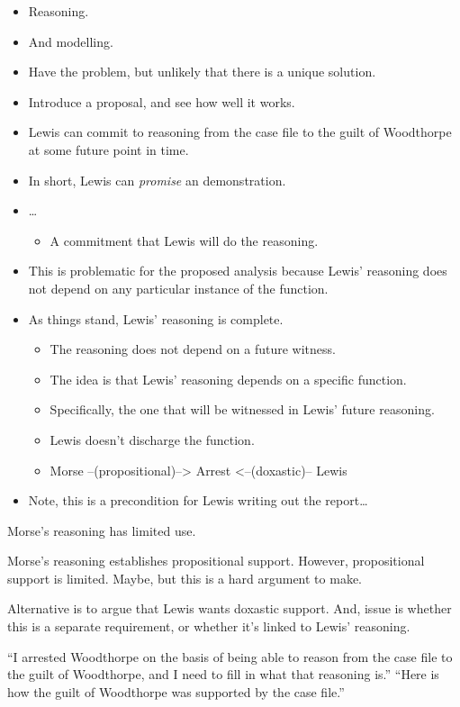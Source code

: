 \documentclass[10pt]{article}
\begin{document}
\begin{itemize}
\item Reasoning.
\item And modelling.
\item Have the problem, but unlikely that there is a unique solution.
\item Introduce a proposal, and see how well it works.
\end{itemize}

\begin{itemize}
\item Lewis can commit to reasoning from the case file to the guilt of Woodthorpe at some future point in time.
\item In short, Lewis can \emph{promise} an demonstration.
\item {\color{red} \dots}
  \begin{itemize}
  \item A commitment that Lewis will do the reasoning.
  \end{itemize}
\item This is problematic for the proposed analysis because Lewis' reasoning does not depend on any particular instance of the function.
\item As things stand, Lewis' reasoning is complete.
  \begin{itemize}
  \item The reasoning does not depend on a future witness.
  \item The idea is that Lewis' reasoning depends on a specific function.
  \item Specifically, the one that will be witnessed in Lewis' future reasoning.
  \item Lewis doesn't discharge the function.
  \item Morse --(propositional)--> Arrest <--(doxastic)-- Lewis
  \end{itemize}
\item {\color{red} Note, this is a precondition for Lewis writing out the report\dots}
\end{itemize}

\begin{note}
  Morse's reasoning has limited use.

  Morse's reasoning establishes propositional support.
  However, propositional support is limited.
  Maybe, but this is a hard argument to make.

  Alternative is to argue that Lewis wants doxastic support.
  And, issue is whether this is a separate requirement, or whether it's linked to Lewis' reasoning.

  ``I arrested Woodthorpe on the basis of being able to reason from the case file to the guilt of Woodthorpe, and I need to fill in what that reasoning is.''
  ``Here is how the guilt of Woodthorpe was supported by the case file.''
\end{note}
\end{document}
